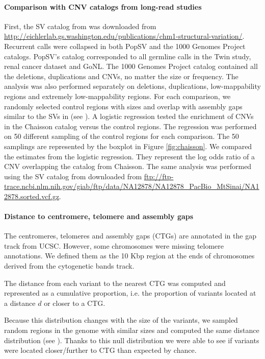 \paragraph{Comparison with CNV catalogs from long-read studies}
First, the SV catalog from \citet{Chaisson2014} was downloaded from \\
\url{http://eichlerlab.gs.washington.edu/publications/chm1-structural-variation/}.
Recurrent calls were collapsed in both {\sf PopSV} and the 1000 Genomes Project catalogs.
{\sf PopSV}'s catalog corresponded to all germline calls in the Twin study, renal cancer dataset and GoNL.
The 1000 Genomes Project catalog contained all the deletions, duplications and CNVs, no matter the size or frequency.
The analysis was also performed separately on deletions, duplications, low-mappability regions and extremely low-mappability regions.
For each comparison, we randomly selected control regions with sizes and overlap with assembly gaps similar to the SVs in \citet{Chaisson2014} (see ).
A logistic regression tested the enrichment of CNVs in the Chaisson catalog versus the control regions.
The regression was performed on 50 different sampling of the control regions for each comparison.
The 50 samplings are represented by the boxplot in Figure \ref{fig:chaisson}.
We compared the estimates from the logistic regression.
They represent the log odds ratio of a CNV overlapping the catalog from Chaisson.
The same analysis was performed using the SV catalog from \citet{Pendleton2015} downloaded from \url{ftp://ftp-trace.ncbi.nlm.nih.gov/giab/ftp/data/NA12878/NA12878_PacBio_MtSinai/NA12878.sorted.vcf.gz}.

\paragraph{Distance to centromere, telomere and assembly gaps}
The centromeres, telomeres and assembly gaps (CTGs) are annotated in the {\sf gap} track from UCSC\cite{Rosenbloom2015}.
However, some chromosomes were missing telomere annotations.
We defined them as the 10 Kbp region at the ends of chromosomes derived from the cytogenetic bands track.

The distance from each variant to the nearest CTG was computed and represented as a cumulative proportion, i.e. the proportion of variants located at a distance $d$ or closer to a CTG.

Because this distribution changes with the size of the variants, we sampled random regions in the genome with similar sizes and computed the same distance distribution (see ).
Thanks to this null distribution we were able to see if variants were located closer/further to CTG than expected by chance.

